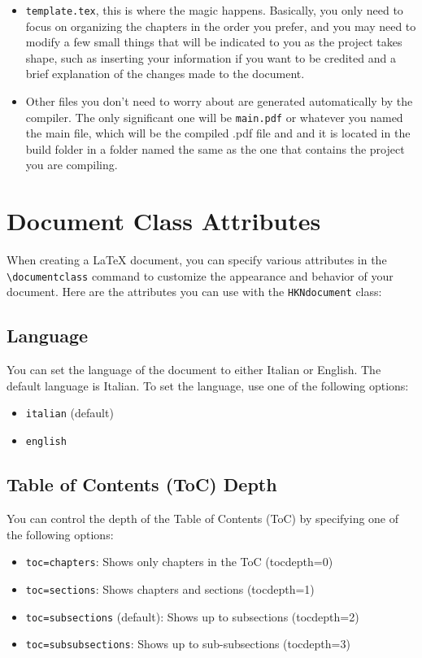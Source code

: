 \begin{itemize}
\begin{itemize}
	\end{itemize}
	\item \texttt{template.tex}, this is where the magic happens. Basically, you only need to focus on organizing the chapters in the order you prefer, and you may need to modify a few small things that will be indicated to you as the project takes shape, such as inserting your information if you want to be credited and a brief explanation of the changes made to the document.
	\item Other files you don’t need to worry about are generated automatically by the compiler. The only significant one will be \texttt{main.pdf} or whatever you named the main file, which will be the compiled .pdf file and and it is located in the build folder in a folder named the same as the one that contains the project you are compiling.
\end{itemize}


\section{Document Class Attributes}

When creating a LaTeX document, you can specify various attributes in the \texttt{\textbackslash documentclass} command to customize the appearance and behavior of your document. Here are the attributes you can use with the \texttt{HKNdocument} class:

\subsection{Language}

You can set the language of the document to either Italian or English. The default language is Italian. To set the language, use one of the following options:
\begin{itemize}
  \item \texttt{italian} (default)
  \item \texttt{english}
\end{itemize}

\subsection{Table of Contents (ToC) Depth}

You can control the depth of the Table of Contents (ToC) by specifying one of the following options:
\begin{itemize}
  \item \texttt{toc=chapters}: Shows only chapters in the ToC (tocdepth=0)
  \item \texttt{toc=sections}: Shows chapters and sections (tocdepth=1)
  \item \texttt{toc=subsections} (default): Shows up to subsections (tocdepth=2)
  \item \texttt{toc=subsubsections}: Shows up to sub-subsections (tocdepth=3)
\end{itemize}

